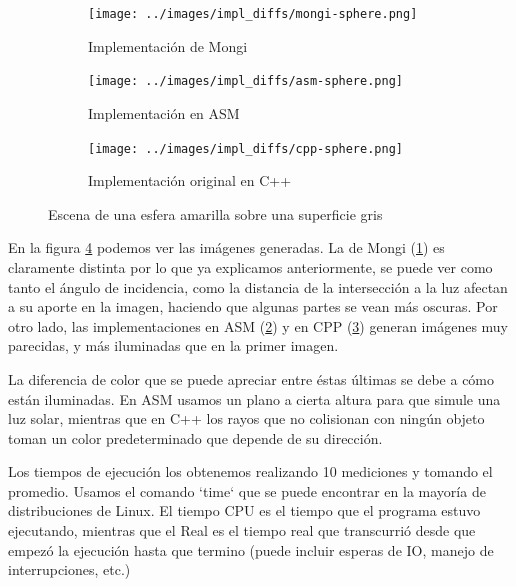 \begin{figure}[H]
    \centering
    \begin{subfigure}[b]{0.45\textwidth}
        \centering
        \texttt{[image: ../images/impl\_diffs/mongi-sphere.png]}
        \caption{Implementación de Mongi}
        \label{fig:yellow-sphere-mongi}
    \end{subfigure}
    \hfill
    \begin{subfigure}[b]{0.45\textwidth}
        \centering
        \texttt{[image: ../images/impl\_diffs/asm-sphere.png]}
        \caption{Implementación en ASM}
        \label{fig:yellow-sphere-asm}
    \end{subfigure}
    \hfill
    \begin{subfigure}[b]{0.45\textwidth}
        \centering
        \texttt{[image: ../images/impl\_diffs/cpp-sphere.png]}
        \caption{Implementación original en C++}
        \label{fig:yellow-sphere-cpp}
    \end{subfigure}

    \caption{Escena de una esfera amarilla sobre una superficie gris}
    \label{fig:yellow-sphere}
\end{figure}

En la figura \ref{fig:yellow-sphere} podemos ver las imágenes generadas. La de
Mongi (\ref{fig:yellow-sphere-mongi}) es claramente distinta por lo que ya
explicamos anteriormente, se puede ver como tanto el ángulo de incidencia, como
la distancia de la intersección a la luz afectan a su aporte en la imagen,
haciendo que algunas partes se vean más oscuras. Por otro lado, las
implementaciones en ASM (\ref{fig:yellow-sphere-asm}) y en CPP
(\ref{fig:yellow-sphere-cpp}) generan imágenes muy parecidas, y más iluminadas
que en la primer imagen.

La diferencia de color que se puede apreciar entre éstas últimas se debe a cómo
están iluminadas. En ASM usamos un plano a cierta altura para que simule una luz
solar, mientras que en C++ los rayos que no colisionan con ningún objeto toman
un color predeterminado que depende de su dirección.

Los tiempos de ejecución los obtenemos realizando 10 mediciones y tomando el
promedio. Usamos el comando `time` que se puede encontrar en la mayoría de
distribuciones de Linux. El tiempo CPU es el tiempo que el programa estuvo
ejecutando, mientras que el Real es el tiempo real que transcurrió desde que
empezó la ejecución hasta que termino (puede incluir esperas de IO,
manejo de interrupciones, etc.)

